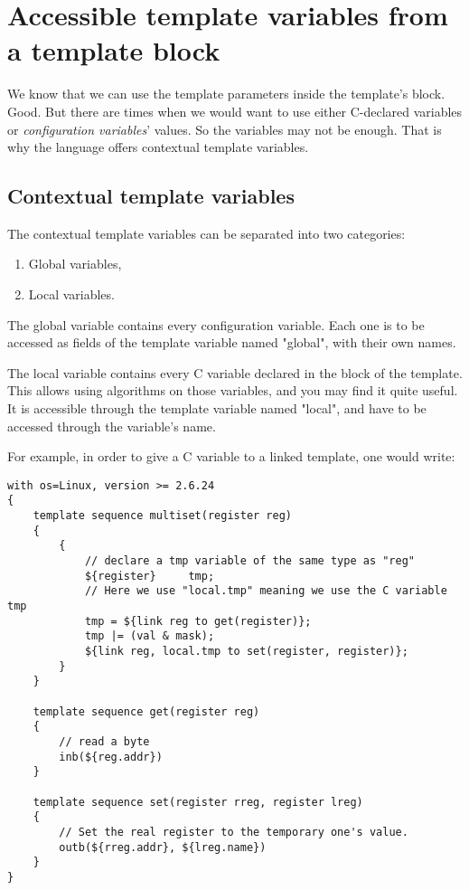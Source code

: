 \documentclass[american]{rtxreport}
\begin{document}
\chapter{Accessible template variables from a template block}

We know that we can use the template parameters inside the template's block.
Good. But there are times when we would want to use either C-declared variables
or \emph{configuration variables}' values. So the variables may not be enough.
That is why the language offers contextual template variables.

\section{Contextual template variables}

The contextual template variables can be separated into two categories:
\begin{enumerate}
    \item Global variables,
    \item Local variables.
\end{enumerate}

The global variable contains every configuration variable. Each one is to be
accessed as fields of the template variable named "global", with their own
names.

The local variable contains every C variable declared in the block of the
template. This allows using algorithms on those variables, and you may find it
quite useful. It is accessible through the template variable named "local", and
have to be accessed through the variable's name.

For example, in order to give a C variable to a linked template, one would
write:
\begin{lstlisting}
with os=Linux, version >= 2.6.24
{
    template sequence multiset(register reg)
    {
        {
            // declare a tmp variable of the same type as "reg"
            ${register}     tmp;
            // Here we use "local.tmp" meaning we use the C variable tmp
            tmp = ${link reg to get(register)};
            tmp |= (val & mask);
            ${link reg, local.tmp to set(register, register)};
        }
    }

    template sequence get(register reg)
    {
        // read a byte
        inb(${reg.addr})
    }

    template sequence set(register rreg, register lreg)
    {
        // Set the real register to the temporary one's value.
        outb(${rreg.addr}, ${lreg.name})
    }
}
\end{lstlisting}
\end{document}
